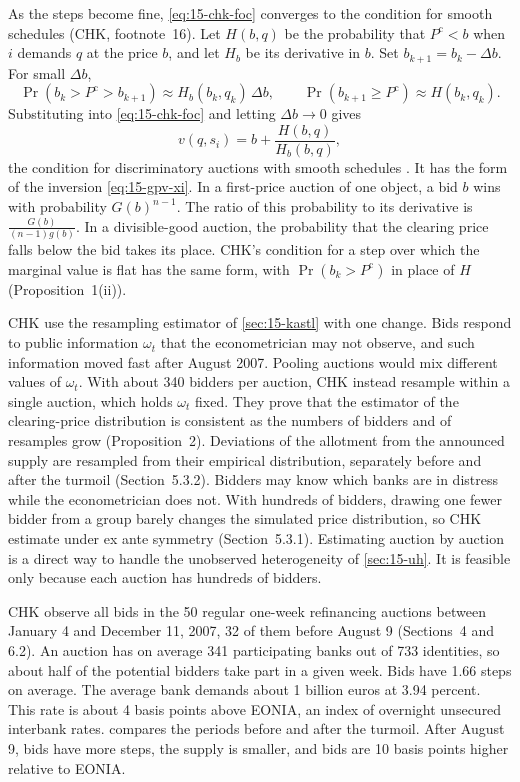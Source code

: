 As the steps become fine, \eqref{eq:15-chk-foc} converges to the condition for smooth schedules (CHK,
footnote~16). Let $H(b,q)$ be the probability that $P^{\mathrm c}<b$ when $i$ demands $q$ at the price $b$, and
let $H_b$ be its derivative in $b$. Set $b_{k+1}=b_k-\Delta b$. For small $\Delta b$,
\[
\Pr(b_k>P^{\mathrm c}>b_{k+1})\approx H_b(b_k,q_k)\,\Delta b,\qquad \Pr(b_{k+1}\ge P^{\mathrm c})\approx H(b_k,q_k).
\]
Substituting into \eqref{eq:15-chk-foc} and letting $\Delta b\to0$ gives
\begin{equation}\label{eq:15-hortacsu-foc}
v(q,s_i)=b+\frac{H(b,q)}{H_b(b,q)} ,
\end{equation}
the condition for discriminatory auctions with smooth schedules \citep[Section~10]{AtheyHaile2007}. It has the
form of the inversion \eqref{eq:15-gpv-xi}. In a first-price auction of one object, a bid $b$ wins with
probability $G(b)^{n-1}$. The ratio of this probability to its derivative is $\frac{G(b)}{(n-1)g(b)}$. In a
divisible-good auction, the probability that the clearing price falls below the bid takes its place. CHK's
condition for a step over which the marginal value is flat has the same form, with $\Pr(b_k>P^{\mathrm c})$ in
place of $H$ (Proposition~1(ii)).

 CHK use the resampling estimator of \cref{sec:15-kastl} with one change. Bids respond to
public information $\omega_t$ that the econometrician may not observe, and such information moved fast after
August 2007. Pooling auctions would mix different values of $\omega_t$. With about 340 bidders per auction,
CHK instead resample within a single auction, which holds $\omega_t$ fixed. They prove that the estimator of
the clearing-price distribution is consistent as the numbers of bidders and of resamples grow
(Proposition~2). Deviations of the allotment from the announced supply are resampled from their empirical
distribution, separately before and after the turmoil (Section~5.3.2). Bidders may know which banks are in
distress while the econometrician does not. With hundreds of bidders, drawing one fewer bidder from a group
barely changes the simulated price distribution, so CHK estimate under ex ante symmetry (Section~5.3.1).
Estimating auction by auction is a direct way to handle the unobserved heterogeneity of \cref{sec:15-uh}. It is
feasible only because each auction has hundreds of bidders.

 CHK observe all bids in the 50 regular one-week refinancing auctions between January 4 and
December 11, 2007, 32 of them before August 9 (Sections~4 and 6.2). An auction has on average 341 participating banks
out of 733 identities, so about half of the potential bidders take part in a given week. Bids have 1.66 steps
on average. The average bank demands about 1 billion euros at 3.94 percent. This rate is about 4 basis points
above EONIA, an index of overnight unsecured interbank rates.  compares the periods
before and after the turmoil. After August 9, bids have more steps, the supply is smaller, and bids are 10
basis points higher relative to EONIA.

